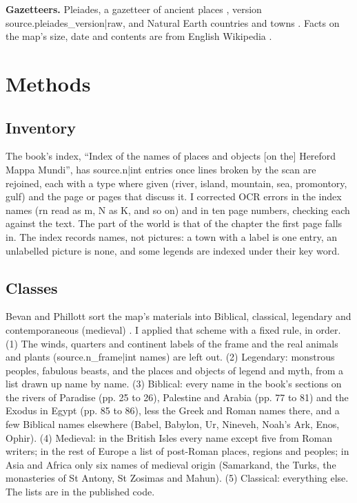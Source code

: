 \documentclass[11pt,a4paper]{article}
\begin{document}
\textbf{Gazetteers.} Pleiades, a gazetteer of ancient places \citep{pleiades}, version {{source.pleiades_version|raw}}, and Natural Earth countries and towns \citep{naturalearth}. Facts on the map's size, date and contents are from English Wikipedia \citep{wiki}.

\section{Methods}
\subsection{Inventory}
The book's index, ``Index of the names of places and objects [on the] Hereford Mappa Mundi'', has {{source.n|int}} entries once lines broken by the scan are rejoined, each with a type where given (river, island, mountain, sea, promontory, gulf) and the page or pages that discuss it. I corrected OCR errors in the index names (rn read as m, N as K, and so on) and in ten page numbers, checking each against the text. The part of the world is that of the chapter the first page falls in. The index records names, not pictures: a town with a label is one entry, an unlabelled picture is none, and some legends are indexed under their key word.

\subsection{Classes}
Bevan and Phillott sort the map's materials into Biblical, classical, legendary and contemporaneous (medieval) \citep[Introduction, section 11]{bevan}. I applied that scheme with a fixed rule, in order. (1) The winds, quarters and continent labels of the frame and the real animals and plants ({{source.n_frame|int}} names) are left out. (2) Legendary: monstrous peoples, fabulous beasts, and the places and objects of legend and myth, from a list drawn up name by name. (3) Biblical: every name in the book's sections on the rivers of Paradise (pp. 25 to 26), Palestine and Arabia (pp. 77 to 81) and the Exodus in Egypt (pp. 85 to 86), less the Greek and Roman names there, and a few Biblical names elsewhere (Babel, Babylon, Ur, Nineveh, Noah's Ark, Enos, Ophir). (4) Medieval: in the British Isles every name except five from Roman writers; in the rest of Europe a list of post-Roman places, regions and peoples; in Asia and Africa only six names of medieval origin (Samarkand, the Turks, the monasteries of St Antony, St Zosimas and Mahun). (5) Classical: everything else. The lists are in the published code.
\end{document}
